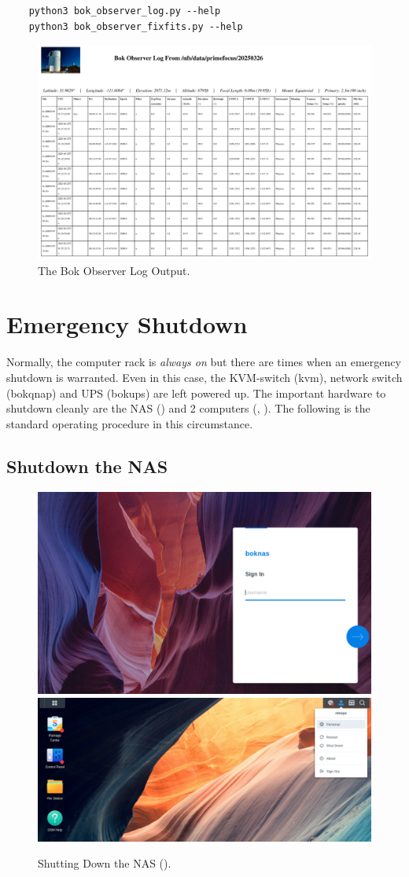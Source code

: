 \documentclass[12pt,twoside]{article}
\begin{document}
\begin{verbatim}
    python3 bok_observer_log.py --help
    python3 bok_observer_fixfits.py --help
\end{verbatim}

\begin{figure}[!h]
 \centering
 \includegraphics[width=0.8\linewidth]{bok_observer_log.png}
 \caption{The Bok Observer Log Output.}
 \label{bokol}
\end{figure}

\section{Emergency Shutdown}
\label{Emergency Shutdown}

Normally, the computer rack is \emph{always on} but there are times when an emergency shutdown is warranted. Even in this case, 
the KVM-switch (kvm), network switch (bokqnap) and UPS (bokups) are left powered up. The important hardware to shutdown cleanly 
are the NAS () and 2 computers (, ). The following is the standard operating
procedure in this circumstance.

\subsection{Shutdown the NAS}
\begin{figure}[!h]
 \centering
 \includegraphics[width=0.45\linewidth]{boknas1.png}
 \includegraphics[width=0.45\linewidth]{boknas3.png}
 \caption{Shutting Down the NAS ().}
 \label{boknasshutdown}
\end{figure}
\end{document}
